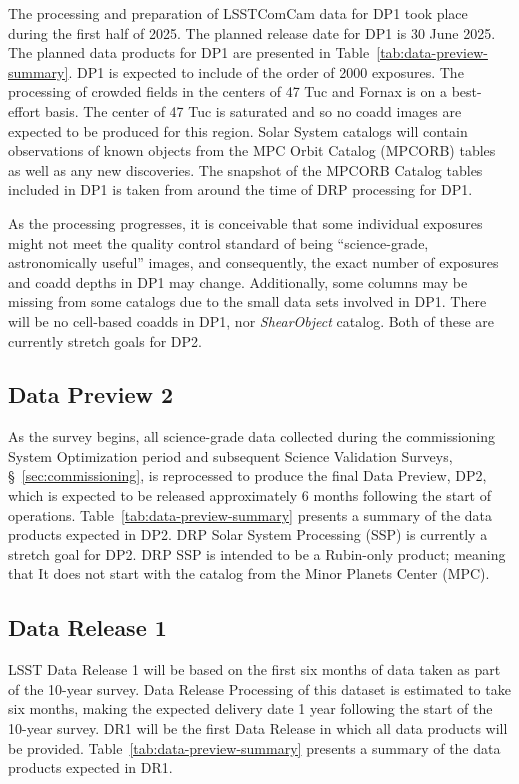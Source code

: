 The  processing and preparation of LSSTComCam data for DP1 took place during the first half of 2025. 
The planned release date for DP1 is 30 June 2025. 
The planned data products for DP1 are presented in Table~\ref{tab:data-preview-summary}.
DP1 is expected to include of the order of 2000 exposures.
The processing of crowded fields in the centers of 47 Tuc and Fornax is on a best-effort basis.
The center of 47 Tuc is saturated and so no coadd images are expected to be produced for this region.
Solar System catalogs will contain observations of known objects from the MPC Orbit Catalog (MPCORB) tables as well as any new discoveries. 
The snapshot of the MPCORB Catalog tables included in DP1 is taken from around the time of DRP processing for DP1. 

As the processing progresses, it is conceivable that some individual exposures might not meet the quality control standard of being ``science-grade, astronomically useful'' images, 
and consequently, the exact number of exposures and coadd depths in DP1 may change.
Additionally, some columns may be missing from some catalogs due to the small data sets involved in DP1.
There will be no cell-based coadds in DP1, nor \textit{ShearObject} catalog.
Both of these are currently stretch goals for DP2.
		
\subsection{Data Preview 2}
\label{ssec:dp2}

As the survey begins, all science-grade data collected during the commissioning System Optimization period and subsequent Science Validation Surveys, \S~\ref{sec:commissioning}, is reprocessed to produce the final Data Preview, DP2, which is expected to be released approximately 6 months following the start of operations.
Table~\ref{tab:data-preview-summary} presents a summary of the data products expected in DP2.
DRP Solar System Processing (SSP)  is currently a stretch goal for DP2. 
DRP SSP is intended to be a Rubin-only product; meaning that  It does not start with the catalog from the Minor Planets Center (MPC).


\subsection{Data Release 1}
\label{ssec:dr1}

LSST Data Release 1 will be based on the first six months of data taken as part of the 10-year survey. 
Data Release Processing of this dataset is estimated to take six months, making the expected delivery date 1 year following the start of the 10-year survey.
DR1 will be the first Data Release in which all data products will be provided.
Table~\ref{tab:data-preview-summary} presents a summary of the data products expected in DR1.



